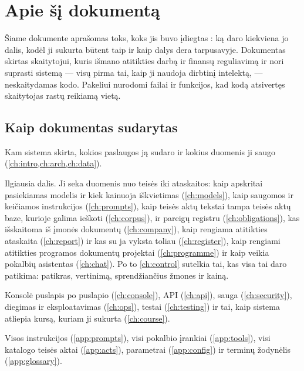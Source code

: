 \chapter*{Apie šį dokumentą}

Šiame dokumente aprašomas \product{} toks, koks jis buvo įdiegtas \docdate: ką daro kiekviena
jo dalis, kodėl ji sukurta būtent taip ir kaip dalys dera tarpusavyje. Dokumentas skirtas skaitytojui,
kuris išmano atitikties darbą ir finansų reguliavimą ir nori suprasti sistemą --- visų pirma
tai, kaip ji naudoja dirbtinį intelektą, --- neskaitydamas kodo. Pakeliui nurodomi failai ir
funkcijos, kad kodą atsivertęs skaitytojas rastų reikiamą vietą.

\section*{Kaip dokumentas sudarytas}

\begin{description}[style=nextline]
  \item[I dalis --- Sistemos apžvalga] Kam sistema skirta, kokios paslaugos ją sudaro ir
    kokius duomenis ji saugo (\cref{ch:intro,ch:arch,ch:data}).
  \item[II dalis --- Dirbtinis intelektas sistemoje] Ilgiausia dalis. Ji seka duomenis nuo
    teisės iki ataskaitos: kaip apskritai pasiekiamas modelis ir kiek kainuoja iškvietimas
    (\cref{ch:models}), kaip saugomos ir keičiamos instrukcijos (\cref{ch:prompts}), kaip
    teisės aktų tekstai tampa teisės aktų baze, kurioje galima ieškoti (\cref{ch:corpus}), ir
    pareigų registru (\cref{ch:obligations}), kas išskaitoma iš įmonės dokumentų
    (\cref{ch:company}), kaip rengiama atitikties ataskaita (\cref{ch:report}) ir kas su ja
    vyksta toliau (\cref{ch:register}), kaip rengiami atitikties programos dokumentų projektai
    (\cref{ch:programme}) ir kaip veikia pokalbių asistentas (\cref{ch:chat}). Po to
    \cref{ch:control} sutelkia tai, kas visa tai daro patikima: patikras, vertinimą,
    sprendžiančius žmones ir kainą.
  \item[III dalis --- Sistemos naudojimas ir eksploatavimas] Konsolė puslapis po puslapio
    (\cref{ch:console}), API (\cref{ch:api}), sauga (\cref{ch:security}), diegimas ir
    eksploatavimas (\cref{ch:ops}), testai (\cref{ch:testing}) ir tai, kaip sistema atliepia
    kursą, kuriam ji sukurta (\cref{ch:course}).
  \item[Žinynas] Visos instrukcijos (\cref{app:prompts}), visi pokalbio įrankiai
    (\cref{app:tools}), visi katalogo teisės aktai (\cref{app:acts}), parametrai
    (\cref{app:config}) ir terminų žodynėlis (\cref{app:glossary}).
\end{description}

